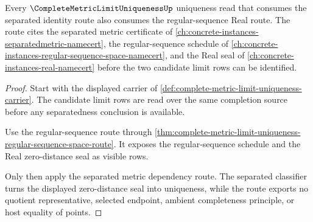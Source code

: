 \begin{theorem}
\label{thm:complete-metric-limit-uniqueness-separated-regular-sequence-lattice-route}
Every $\CompleteMetricLimitUniquenessUp$ uniqueness read that consumes the separated identity route also consumes the regular-sequence Real route. The route cites the separated metric certificate of \autoref{ch:concrete-instances-separatedmetric-namecert}, the regular-sequence schedule of \autoref{ch:concrete-instances-regular-sequence-space-namecert}, and the Real seal of \autoref{ch:concrete-instances-real-namecert} before the two candidate limit rows can be identified.
\end{theorem}
\begin{proof}
Start with the displayed carrier of \autoref{def:complete-metric-limit-uniqueness-carrier}. The candidate limit rows are read over the same completion source before any separatedness conclusion is available.

Use the regular-sequence route through \autoref{thm:complete-metric-limit-uniqueness-regular-sequence-space-route}. It exposes the regular-sequence schedule and the Real zero-distance seal as visible rows.

Only then apply the separated metric dependency route. The separated classifier turns the displayed zero-distance seal into uniqueness, while the route exports no quotient representative, selected endpoint, ambient completeness principle, or host equality of points.
\end{proof}
